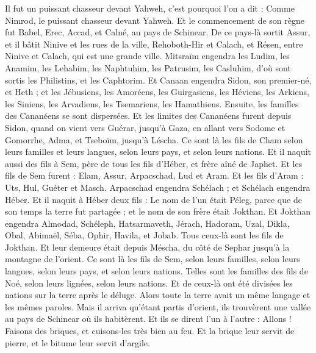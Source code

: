 \begin{multicols}{2}
Il fut un puissant chasseur devant Yahweh, c'est pourquoi l'on a dit : Comme Nimrod, le puissant chasseur devant Yahweh.
Et le commencement de son règne fut Babel, Erec, Accad, et Calné, au pays de Schinear.
De ce pays-là sortit Assur, et il bâtit Ninive et les rues de la ville, Rehoboth-Hir et Calach,
et Résen, entre Ninive et Calach, qui est une grande ville.
Mitsraïm engendra les Ludim, les Anamim, les Lehabim, les Naphtuhim,
les Patrusim, les Casluhim, d'où sont sortis les Philistins, et les Caphtorim.
Et Canaan engendra Sidon, son premier-né, et Heth ;
et les Jébusiens, les Amoréens, les Guirgasiens,
les Héviens, les Arkiens, les Siniens,
les Arvadiens, les Tsemariens, les Hamathiens. Ensuite, les familles des Cananéens se sont dispersées.
Et les limites des Cananéens furent depuis Sidon, quand on vient vers Guérar, jusqu'à Gaza, en allant vers Sodome et Gomorrhe, Adma, et Tseboïm, jusqu'à Léscha.
Ce sont là les fils de Cham selon leurs familles et leurs langues, selon leurs pays, et selon leurs nations.
Et il naquit aussi des fils à Sem, père de tous les fils d'Héber, et frère aîné de Japhet.
Et les fils de Sem furent : Elam, Assur, Arpacschad, Lud et Aram.
Et les fils d'Aram : Uts, Hul, Guéter et Masch.
Arpacschad engendra Schélach ; et Schélach engendra Héber.
Et il naquit à Héber deux fils : Le nom de l'un était Péleg, parce que de son temps la terre fut partagée ; et le nom de son frère était Jokthan.
Et Jokthan engendra Almodad, Schéleph, Hatsarmaveth, Jérach,
Hadoram, Uzal, Dikla,
Obal, Abimaël, Séba,
Ophir, Havila, et Jobab. Tous ceux-là sont les fils de Jokthan.
Et leur demeure était depuis Méscha, du côté de Sephar jusqu'à la montagne de l'orient.
Ce sont là les fils de Sem, selon leurs familles, selon leurs langues, selon leurs pays, et selon leurs nations.
Telles sont les familles des fils de Noé, selon leurs lignées, selon leurs nations. Et de ceux-là ont été divisées les nations sur la terre après le déluge.
\VerseOne{}Alors toute la terre avait un même langage et les mêmes paroles.
Mais il arriva qu'étant partis d'orient, ils trouvèrent une vallée au pays de Schinear où ils habitèrent.
Et ils se dirent l'un à l'autre : Allons ! Faisons des briques, et cuisons-les très bien au feu. Et la brique leur servit de pierre, et le bitume leur servit d'argile.

\end{multicols}
